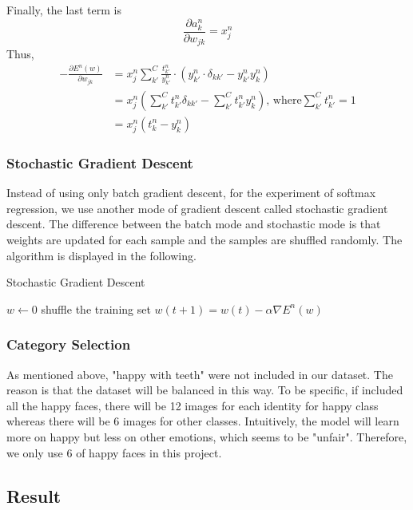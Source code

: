 \documentclass{article}
\begin{document}
Finally, the last term is
\begin{equation}
\frac{\partial a_k^n}{\partial w_{jk}} = x_j^n
\end{equation}
Thus,
\begin{equation}
\begin{split}
 -\frac{\partial E^n(w)}{\partial w_{jk}}&=x_j^n \sum\limits_{k'}^C{\frac{t_{k'}^n}{y_{k'}^n}}\cdot (y_{k'}^n\cdot \delta_{kk'}-y_{k'}^ny_k^n)\\
 &= x_j^n(\sum\limits_{k'}^C{t_{k'}^n}\delta_{kk'}-\sum\limits_{k'}^C {t_{k'}^n}y_{k}^n)
 \text{, where} \sum\limits_{k'}^C {t_{k'}^n} =1\\
    &= x_j^n(t_k^n - y_k^n)
\end{split}
\end{equation}
\subsubsection{Stochastic Gradient Descent}
Instead of using only batch gradient descent, for the experiment of softmax regression, we use another mode of gradient descent called stochastic gradient descent. The difference between the batch mode and stochastic mode is that weights are updated for each sample and the samples are shuffled randomly. The algorithm is displayed in the following.
\begin{algorithm}
        \caption{Stochastic Gradient Descent}
        \begin{algorithmic}[1]
             \State $w\leftarrow0$
                \State shuffle the training set
                    \State $w(t+1) = w(t) -\alpha \nabla E^{n}(w)$
                \EndFor
             \EndFor
        \end{algorithmic}
\end{algorithm}
\subsubsection{Category Selection}
As mentioned above, "happy with teeth" were not included in our dataset. The reason is that the dataset will be balanced in this way. To be specific, if included all the happy faces, there will be 12 images for each identity for happy class whereas there will be 6 images for other classes. Intuitively, the model will learn more on happy but less on other emotions, which seems to be "unfair". Therefore, we only use 6 of happy faces in this project.
\subsection{Result}
\end{document}

